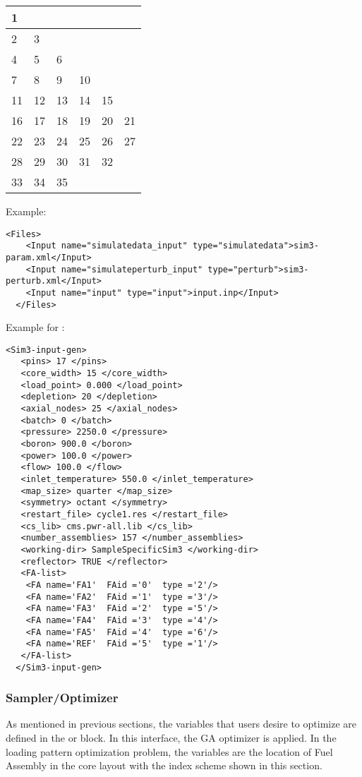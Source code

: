 \begin{center}
  \begin{tabular}{ |p{0.5cm}|p{0.5cm}|p{0.5cm}|p{0.5cm}|p{0.5cm}|p{0.5cm}| } 
    \hline
    1& & & & &       \\ 
    \hline
    2&3& & & &        \\ 
    \hline
    4&5&6& & &        \\ 
    \hline
    7&8&9&10& &       \\ 
    \hline
    11&12&13&14&15&   \\ 
    \hline
    16&17&18&19&20&21  \\ 
    \hline
    22&23&24&25&26&27 \\ 
    \hline
    28&29&30&31&32&    \\ 
    \hline
    33&34&35&  &  &   \\ 
    \hline
  \end{tabular}
\end{center}
  
Example:
  \begin{lstlisting}[style=XML]
  <Files>
    <Input name="simulatedata_input" type="simulatedata">sim3-param.xml</Input>
    <Input name="simulateperturb_input" type="perturb">sim3-perturb.xml</Input>
    <Input name="input" type="input">input.inp</Input>
  </Files>
  \end{lstlisting}
Example for :
  \begin{lstlisting}[style=XML]
  <Sim3-input-gen>
   <pins> 17 </pins>
   <core_width> 15 </core_width>
   <load_point> 0.000 </load_point>
   <depletion> 20 </depletion>
   <axial_nodes> 25 </axial_nodes>
   <batch> 0 </batch>
   <pressure> 2250.0 </pressure>
   <boron> 900.0 </boron>
   <power> 100.0 </power>
   <flow> 100.0 </flow>
   <inlet_temperature> 550.0 </inlet_temperature>
   <map_size> quarter </map_size>
   <symmetry> octant </symmetry>
   <restart_file> cycle1.res </restart_file>
   <cs_lib> cms.pwr-all.lib </cs_lib>
   <number_assemblies> 157 </number_assemblies>
   <working-dir> SampleSpecificSim3 </working-dir>
   <reflector> TRUE </reflector>
   <FA-list>
	<FA name='FA1'  FAid ='0'  type ='2'/>
	<FA name='FA2'  FAid ='1'  type ='3'/>
	<FA name='FA3'  FAid ='2'  type ='5'/>
	<FA name='FA4'  FAid ='3'  type ='4'/>
	<FA name='FA5'  FAid ='4'  type ='6'/>
	<FA name='REF'  FAid ='5'  type ='1'/>
   </FA-list>
  </Sim3-input-gen>
  \end{lstlisting}
\subsubsection{Sampler/Optimizer}
As mentioned in previous sections, the variables that users desire to optimize are defined in 
the  or   block. In this interface, the GA optimizer is applied.
In the loading pattern optimization problem, the variables are the location of Fuel Assembly in the core layout
with the index scheme shown in this section.

